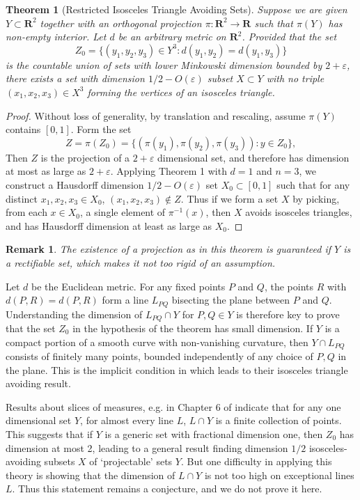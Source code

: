 \documentclass[usenames,dvipsnames]{article}
\theoremstyle{plain}
\theoremstyle{plain}
\newtheorem{theorem}{Theorem}
\newtheorem*{remark}{Remark}
\begin{document}
\begin{theorem}[Restricted Isosceles Triangle Avoiding Sets]
	Suppose we are given $Y \subset \mathbf{R}^2$ together with an orthogonal projection $\pi: \mathbf{R}^2 \to \mathbf{R}$ such that $\pi(Y)$ has non-empty interior. Let $d$ be an arbitrary metric on $\mathbf{R}^2$. Provided that the set
	\[ Z_0 = \{ (y_1,y_2,y_3) \in Y^3 : d(y_1,y_2) = d(y_1,y_3) \} \]
	is the countable union of sets with lower Minkowski dimension bounded by $2 + \varepsilon$, there exists a set with dimension $1/2 - O(\varepsilon)$ subset $X \subset Y$ with no triple $(x_1,x_2,x_3) \in X^3$ forming the vertices of an isosceles triangle.
\end{theorem}
\begin{proof}
	Without loss of generality, by translation and rescaling, assume $\pi(Y)$ contains $[0,1]$. Form the set
	\[ Z = \pi(Z_0) = \{ (\pi(y_1), \pi(y_2), \pi(y_3)) : y \in Z_0 \}, \]
	Then $Z$ is the projection of a $2 + \varepsilon$ dimensional set, and therefore has dimension at most as large as $2 + \varepsilon$. Applying Theorem 1 with $d = 1$ and $n = 3$, we construct a Hausdorff dimension $1/2 - O(\varepsilon)$ set $X_0 \subset [0,1]$ such that for any distinct $x_1, x_2, x_3 \in X_0$, $(x_1, x_2, x_3) \not \in Z$. Thus if we form a set $X$ by picking, from each $x \in X_0$, a single element of $\pi^{-1}(x)$, then $X$ avoids isosceles triangles, and has Hausdorff dimension at least as large as $X_0$.
\end{proof}

\begin{remark}
	The existence of a projection as in this theorem is guaranteed if $Y$ is a rectifiable set, which makes it not too rigid of an assumption. 
\end{remark}

Let $d$ be the Euclidean metric. For any fixed points $P$ and $Q$, the points $R$ with $d(P,R) = d(P,R)$ form a line $L_{PQ}$ bisecting the plane between $P$ and $Q$. Understanding the dimension of $L_{PQ} \cap Y$ for $P,Q \in Y$ is therefore key to prove that the set $Z_0$ in the hypothesis of the theorem has small dimension. If $Y$ is a compact portion of a smooth curve with non-vanishing curvature, then $Y \cap L_{PQ}$ consists of finitely many points, bounded independently of any choice of $P,Q$ in the plane. This is the implicit condition in \cite{MalabikaRob} which leads to their isosceles triangle avoiding result.

Results about slices of measures, e.g. in Chapter 6 of \cite{Matilla} indicate that for any one dimensional set $Y$, for almost every line $L$, $L \cap Y$ is a finite collection of points. This suggests that if $Y$ is a generic set with fractional dimension one, then $Z_0$ has dimension at most 2, leading to a general result finding dimension $1/2$ isosceles-avoiding subsets $X$ of `projectable' sets $Y$. But one difficulty in applying this theory is showing that the dimension of $L \cap Y$ is not too high on exceptional lines $L$. Thus this statement remains a conjecture, and we do not prove it here.
\end{document}
